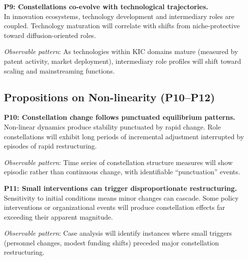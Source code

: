 \documentclass[../main.tex]{subfiles}
\begin{document}
\begin{propositionbox}
\textbf{P9: Constellations co-evolve with technological trajectories.}\\[3pt]
In innovation ecosystems, technology development and intermediary roles are coupled. Technology maturation will correlate with shifts from niche-protective toward diffusion-oriented roles.

\vspace{4pt}
\textit{Observable pattern}: As technologies within KIC domains mature (measured by patent activity, market deployment), intermediary role profiles will shift toward scaling and mainstreaming functions.
\end{propositionbox}

\subsection{Propositions on Non-linearity (P10--P12)}

\begin{propositionbox}
\textbf{P10: Constellation change follows punctuated equilibrium patterns.}\\[3pt]
Non-linear dynamics produce stability punctuated by rapid change. Role constellations will exhibit long periods of incremental adjustment interrupted by episodes of rapid restructuring.

\vspace{4pt}
\textit{Observable pattern}: Time series of constellation structure measures will show episodic rather than continuous change, with identifiable ``punctuation'' events.
\end{propositionbox}

\begin{propositionbox}
\textbf{P11: Small interventions can trigger disproportionate restructuring.}\\[3pt]
Sensitivity to initial conditions means minor changes can cascade. Some policy interventions or organizational events will produce constellation effects far exceeding their apparent magnitude.

\vspace{4pt}
\textit{Observable pattern}: Case analysis will identify instances where small triggers (personnel changes, modest funding shifts) preceded major constellation restructuring.
\end{propositionbox}
\end{document}
